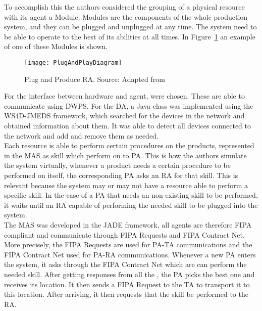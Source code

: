 To accomplish this the authors considered the grouping of a physical resource with its agent a Module. Modules are the components of the whole production system, and they can be plugged and unplugged at any time. The system need to be able to operate to the best of its abilities at all times. In Figure~\ref{fig:plug_and_play_device_architecture} an example of one of these Modules is shown.\\

\begin{figure}[h!]
	\centering
	\texttt{[image: PlugAndPlayDiagram]}
	\caption{Plug and Produce \acrshort{RA}. Source: Adapted from \cite{8972169}}
	\label{fig:plug_and_play_device_architecture}
\end{figure}

For the interface between hardware and agent,  were chosen. These  are able to communicate using \acrfull{DWPS}. For the \acrshort{DA}, a Java class was implemented using the \acrfull{WS4D-JMEDS} framework, which searched for the devices in the network and obtained information about them. It was able to detect all devices connected to the network and add and remove them as needed.\\

Each resource is able to perform certain procedures on the products, represented in the \acrshort{MAS} as skill which  perform on to \acrshort{PA}. This is how the authors simulate the system virtually, whenever a product needs a certain procedure to be performed on itself, the corresponding \acrshort{PA} asks an \acrshort{RA} for that skill. This is relevant because the system may or may not have a resource able to perform a specific skill. In the case of a \acrshort{PA} that needs an non-existing skill to be performed, it waits until an \acrshort{RA} capable of performing the needed skill to be plugged into the system.\\

The \acrshort{MAS} was developed in the \acrshort{JADE} framework, all agents are therefore \acrshort{FIPA} compliant and communicate through \acrshort{FIPA} Requests and \acrshort{FIPA} Contract Net. More precisely, the \acrshort{FIPA} Requests are used for \acrshort{PA}-\acrshort{TA} communications and the \acrshort{FIPA} Contract Net used for \acrshort{PA}-\acrshort{RA} communications. Whenever a new \acrshort{PA} enters the system, it asks through the \acrshort{FIPA} Contract Net which  are can perform the needed skill. After getting responses from all the , the \acrshort{PA} picks the best one and receives its location. It then sends a \acrshort{FIPA} Request to the \acrshort{TA} to transport it to this location. After arriving, it then requests that the skill be performed to the \acrshort{RA}.\\

